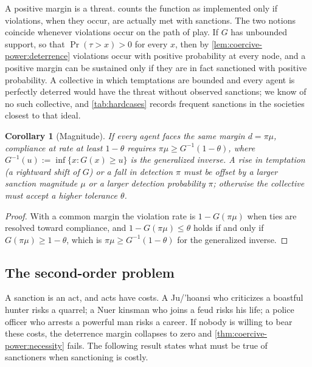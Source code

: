 \documentclass[11pt,letterpaper]{article}
\newtheorem{corollary}[theorem]{Corollary}
\theoremstyle{definition}
\theoremstyle{remark}
\renewcommand{\Pr}{\operatorname{Pr}}
\begin{document}
A positive margin is a threat.  counts the function as implemented only if violations, when they occur, are actually met with sanctions. The two notions coincide whenever violations occur on the path of play. If $G$ has unbounded support, so that $\Pr(\tau > x) > 0$ for every $x$, then by \cref{lem:coercive-power:deterrence} violations occur with positive probability at every node, and a positive margin can be sustained only if they are in fact sanctioned with positive probability. A collective in which temptations are bounded and every agent is perfectly deterred would have the threat without observed sanctions; we know of no such collective, and \cref{tab:hardcases} records frequent sanctions in the societies closest to that ideal.

\begin{corollary}[Magnitude]
\label{cor:coercive-power:magnitude}
If every agent faces the same margin $d = \pi\mu$, compliance at rate at least $1 - \theta$ requires $\pi\mu \ge G^{-1}(1 - \theta)$, where $G^{-1}(u) := \inf\{x : G(x) \ge u\}$ is the generalized inverse. A rise in temptation (a rightward shift of $G$) or a fall in detection $\pi$ must be offset by a larger sanction magnitude $\mu$ or a larger detection probability $\pi$; otherwise the collective must accept a higher tolerance $\theta$.
\end{corollary}

\begin{proof}
With a common margin the violation rate is $1 - G(\pi\mu)$ when ties are resolved toward compliance, and $1 - G(\pi\mu) \le \theta$ holds if and only if $G(\pi\mu) \ge 1 - \theta$, which is $\pi\mu \ge G^{-1}(1-\theta)$ for the generalized inverse.
\end{proof}

\subsection{The second-order problem}

A sanction is an act, and acts have costs. A Ju/'hoansi who criticizes a boastful hunter risks a quarrel; a Nuer kinsman who joins a feud risks his life; a police officer who arrests a powerful man risks a career. If nobody is willing to bear these costs, the deterrence margin collapses to zero and \cref{thm:coercive-power:necessity} fails. The following result states what must be true of sanctioners when sanctioning is costly.
\end{document}
